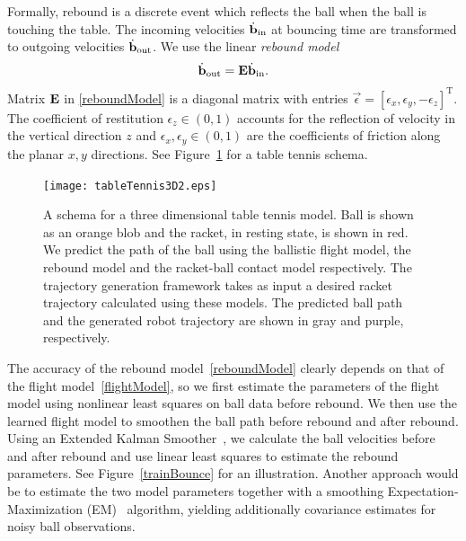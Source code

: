 Formally, rebound is a discrete event which reflects the ball when the ball is touching the table. The incoming velocities  $\dot{\boldsymbol{\mathrm{b}}}_{\mathrm{in}}$ at bouncing time are transformed to outgoing velocities $\dot{\boldsymbol{\mathrm{b}}}_{\mathrm{out}}$. We use the linear \emph{rebound model}
%
\begin{align}
\dot{\boldsymbol{\mathrm{b}}}_{\mathrm{out}} = \boldsymbol{\mathrm{E}}\dot{\boldsymbol{\mathrm{b}}}_{\mathrm{in}}.
\label{reboundModel}
\end{align}
%
Matrix $\boldsymbol{\mathrm{E}}$ in \eqref{reboundModel} is a diagonal matrix with entries $\vec{\epsilon} = [\epsilon_{x}, \epsilon_{y}, -\epsilon_{z}]^{\mathrm{T}}$. The coefficient of restitution $\epsilon_{z} \in (0,1)$ accounts for the reflection of velocity in the vertical direction $z$ and $\epsilon_{x}, \epsilon_{y} \in (0,1)$ are the coefficients of friction along the planar $x,y$ directions. See Figure~\ref{models} for a table tennis schema. 

\begin{figure}[t!]
\centering
\texttt{[image: tableTennis3D2.eps]}			
\caption{A schema for a three dimensional table tennis model. Ball is shown as an orange blob and the racket, in resting state, is shown in red. We predict the path of the ball using the ballistic flight model, the rebound model and the racket-ball contact model respectively. The trajectory generation framework takes as input a desired racket trajectory calculated using these models. The predicted ball path and the generated robot trajectory are shown in gray and purple, respectively.}
\label{models}
\end{figure}

The accuracy of the rebound model~\eqref{reboundModel} clearly depends on that of the flight model~\eqref{flightModel}, so we first estimate the parameters of the flight model using nonlinear least squares on ball data before rebound. We then use the learned flight model to smoothen the ball path before rebound and after rebound. Using an Extended Kalman Smoother~\cite{Sorenson85}, we calculate the ball velocities before and after rebound and use linear least squares to estimate the rebound parameters. See Figure~\ref{trainBounce} for an illustration. Another approach would be to estimate the two model parameters together with a smoothing Expectation-Maximization (EM)~\cite{Shumway82} algorithm, yielding additionally covariance estimates for noisy ball observations. 

